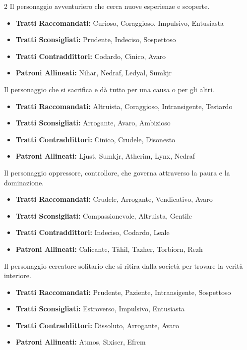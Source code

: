 \begin{multicols}{2}
Il personaggio avventuriero che cerca nuove esperienze e scoperte.

\noindent\begin{itemize}[leftmargin=*] \setlength{\itemsep}{0pt}
\item \textbf{Tratti Raccomandati:} Curioso, Coraggioso, Impulsivo, Entusiasta
\item \textbf{Tratti Sconsigliati:} Prudente, Indeciso, Sospettoso
\item \textbf{Tratti Contraddittori:} Codardo, Cinico, Avaro
\item \textbf{Patroni Allineati:} Nihar, Nedraf, Ledyal, Sumkjr
\end{itemize}

Il personaggio che si sacrifica e dà tutto per una causa o per gli altri.

\noindent\begin{itemize}[leftmargin=*] \setlength{\itemsep}{0pt}
\item \textbf{Tratti Raccomandati:} Altruista, Coraggioso, Intransigente, Testardo
\item \textbf{Tratti Sconsigliati:} Arrogante, Avaro, Ambizioso
\item \textbf{Tratti Contraddittori:} Cinico, Crudele, Disonesto
\item \textbf{Patroni Allineati:} Ljust, Sumkjr, Atherim, Lynx, Nedraf
\end{itemize}

Il personaggio oppressore, controllore, che governa attraverso la paura e la dominazione.

\noindent\begin{itemize}[leftmargin=*] \setlength{\itemsep}{0pt}
\item \textbf{Tratti Raccomandati:} Crudele, Arrogante, Vendicativo, Avaro
\item \textbf{Tratti Sconsigliati:} Compassionevole, Altruista, Gentile
\item \textbf{Tratti Contraddittori:} Indeciso, Codardo, Leale
\item \textbf{Patroni Allineati:} Calicante, Tàhil, Tazher, Torbiorn, Rezh
\end{itemize}

Il personaggio cercatore solitario che si ritira dalla società per trovare la verità interiore.

\noindent\begin{itemize}[leftmargin=*] \setlength{\itemsep}{0pt}
\item \textbf{Tratti Raccomandati:} Prudente, Paziente, Intransigente, Sospettoso
\item \textbf{Tratti Sconsigliati:} Estroverso, Impulsivo, Entusiasta
\item \textbf{Tratti Contraddittori:} Dissoluto, Arrogante, Avaro
\item \textbf{Patroni Allineati:} Atmos, Sixiser, Efrem
\end{itemize}


\end{multicols}
